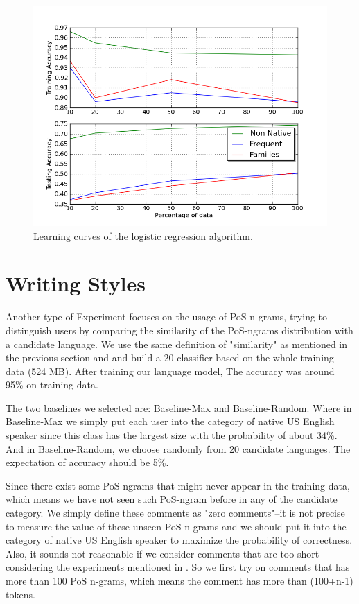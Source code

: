 \documentclass[11pt]{article}
\begin{document}
\begin{figure}[htp]
\centering
\includegraphics[scale=0.45]{combined_lc.png}
\caption{Learning curves of the logistic regression algorithm.}
\label{comb_lc}
\end{figure}





\section{Writing Styles}

Another type of Experiment focuses on the usage of PoS n-grams, trying to distinguish users by comparing the similarity of the PoS-ngrams distribution with a candidate language. We use the same definition of "similarity" as mentioned in the previous section and \cite {alpaydin2004introduction} and build a 20-classifier based on the whole training data (524 MB). After training our language model, The accuracy was around 95\% on training data.

The two baselines we selected are: Baseline-Max and Baseline-Random. Where in Baseline-Max we simply put each user into the category of native US English speaker since this class has the largest size with the
probability of about 34\%. And in Baseline-Random, we choose randomly from 20 candidate languages. The expectation of accuracy should be 5\%.

Since there exist some PoS-ngrams that might never appear in the training data, which means we have not seen such PoS-ngram before in any of the candidate category. We simply define these comments as "zero comments"--it is not precise to measure the value of these unseen PoS n-grams and we should put it into the category of native US English speaker to maximize the probability of correctness. Also, it sounds not reasonable if we consider comments that are too short considering the experiments mentioned in \cite {wagner2009judging}. So we first try on comments that has more than 100 PoS n-grams, which means the comment has more than (100+n-1) tokens.
\end{document}
